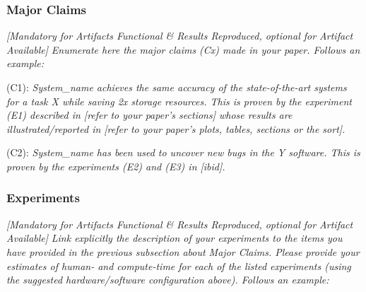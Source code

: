 \subsubsection{Major Claims}
{\em [Mandatory for Artifacts Functional \& Results Reproduced, optional for
Artifact Available]} \textit{Enumerate here the major claims (Cx) made in your
paper. Follows an example:}\\

\begin{compactdesc}

    \item[(C1):] \textit{System\_name achieves the same accuracy of the state-of-the-art
    systems for a task X while saving 2x storage resources. This is proven by
    the experiment (E1) described in [refer to your paper's sections] whose
    results are illustrated/reported in [refer to your paper's plots, tables,
    sections or the sort].}

    \item[(C2):] \textit{System\_name has been used to uncover new bugs in the Y
    software. This is proven by the experiments (E2) and (E3) in [ibid].}

\end{compactdesc}

\subsubsection{Experiments}
{\em [Mandatory for Artifacts Functional \& Results Reproduced, optional for
Artifact Available]} \textit{Link explicitly the description of your experiments
to the items you have provided in the previous subsection about Major Claims.
Please provide your estimates of human- and compute-time for each of the listed
experiments (using the suggested hardware/software configuration above). Follows
an example:}

